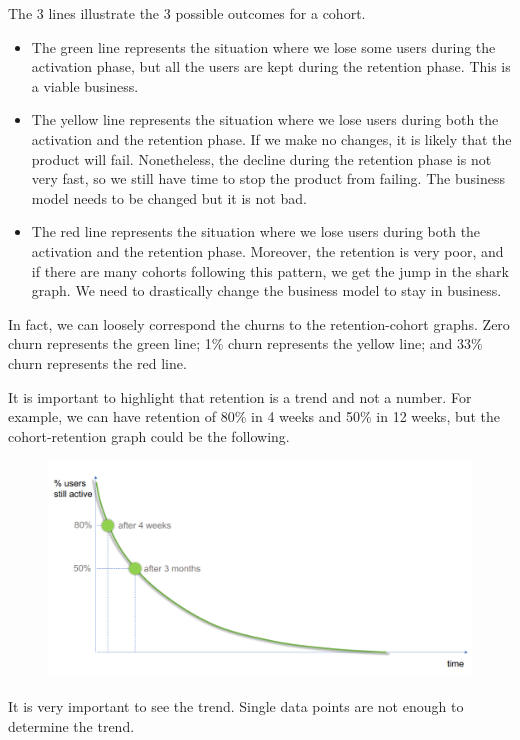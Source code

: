 \documentclass[a4paper, openany]{memoir}
\begin{document}
The 3 lines illustrate the 3 possible outcomes for a cohort.
\begin{itemize}
    \item The green line represents the situation where we lose some users during the activation phase, but all the users are kept during the retention phase. This is a viable business.
    \item The yellow line represents the situation where we lose users during both the activation and the retention phase. If we make no changes, it is likely that the product will fail. Nonetheless, the decline during the retention phase is not very fast, so we still have time to stop the product from failing. The business model needs to be changed but it is not bad.
    \item The red line represents the situation where we lose users during both the activation and the retention phase. Moreover, the retention is very poor, and if there are many cohorts following this pattern, we get the jump in the shark graph. We need to drastically change the business model to stay in business.
\end{itemize}

In fact, we can loosely correspond the churns to the retention-cohort graphs. Zero churn represents the green line; 1\% churn represents the yellow line; and 33\% churn represents the red line.

It is important to highlight that retention is a trend and not a number. For example, we can have retention of 80\% in 4 weeks and 50\% in 12 weeks, but the cohort-retention graph could be the following.
\begin{figure}[H]
    \centering
    \includegraphics[scale=0.45]{src/18.15 Retention Trend v Retention Isolated Points.PNG}
\end{figure}
\noindent It is very important to see the trend. Single data points are not enough to determine the trend.
\end{document}
